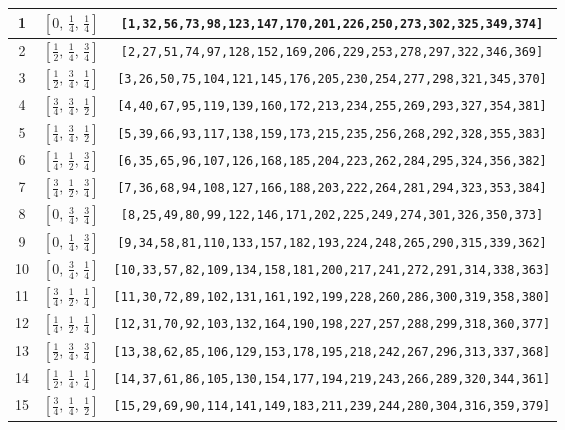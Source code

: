 \documentclass[fleqn,8pt]{jsarticle}
\begin{document}
\begin{longtable}{ccc}
1 & $\left[ 0,\, \frac{1}{4},\, \frac{1}{4} \right]$ & {\tt [1,32,56,73,98,123,147,170,201,226,250,273,302,325,349,374]} \\ \hline
2 & $\left[ \frac{1}{2},\, \frac{1}{4},\, \frac{3}{4} \right]$ & {\tt [2,27,51,74,97,128,152,169,206,229,253,278,297,322,346,369]} \\ \hline
3 & $\left[ \frac{1}{2},\, \frac{3}{4},\, \frac{1}{4} \right]$ & {\tt [3,26,50,75,104,121,145,176,205,230,254,277,298,321,345,370]} \\ \hline
4 & $\left[ \frac{3}{4},\, \frac{3}{4},\, \frac{1}{2} \right]$ & {\tt [4,40,67,95,119,139,160,172,213,234,255,269,293,327,354,381]} \\ \hline
5 & $\left[ \frac{1}{4},\, \frac{3}{4},\, \frac{1}{2} \right]$ & {\tt [5,39,66,93,117,138,159,173,215,235,256,268,292,328,355,383]} \\ \hline
6 & $\left[ \frac{1}{4},\, \frac{1}{2},\, \frac{3}{4} \right]$ & {\tt [6,35,65,96,107,126,168,185,204,223,262,284,295,324,356,382]} \\ \hline
7 & $\left[ \frac{3}{4},\, \frac{1}{2},\, \frac{3}{4} \right]$ & {\tt [7,36,68,94,108,127,166,188,203,222,264,281,294,323,353,384]} \\ \hline
8 & $\left[ 0,\, \frac{3}{4},\, \frac{3}{4} \right]$ & {\tt [8,25,49,80,99,122,146,171,202,225,249,274,301,326,350,373]} \\ \hline
9 & $\left[ 0,\, \frac{1}{4},\, \frac{3}{4} \right]$ & {\tt [9,34,58,81,110,133,157,182,193,224,248,265,290,315,339,362]} \\ \hline
10 & $\left[ 0,\, \frac{3}{4},\, \frac{1}{4} \right]$ & {\tt [10,33,57,82,109,134,158,181,200,217,241,272,291,314,338,363]} \\ \hline
11 & $\left[ \frac{3}{4},\, \frac{1}{2},\, \frac{1}{4} \right]$ & {\tt [11,30,72,89,102,131,161,192,199,228,260,286,300,319,358,380]} \\ \hline
12 & $\left[ \frac{1}{4},\, \frac{1}{2},\, \frac{1}{4} \right]$ & {\tt [12,31,70,92,103,132,164,190,198,227,257,288,299,318,360,377]} \\ \hline
13 & $\left[ \frac{1}{2},\, \frac{3}{4},\, \frac{3}{4} \right]$ & {\tt [13,38,62,85,106,129,153,178,195,218,242,267,296,313,337,368]} \\ \hline
14 & $\left[ \frac{1}{2},\, \frac{1}{4},\, \frac{1}{4} \right]$ & {\tt [14,37,61,86,105,130,154,177,194,219,243,266,289,320,344,361]} \\ \hline
15 & $\left[ \frac{3}{4},\, \frac{1}{4},\, \frac{1}{2} \right]$ & {\tt [15,29,69,90,114,141,149,183,211,239,244,280,304,316,359,379]} \\ \hline

\end{longtable}
\end{document}

